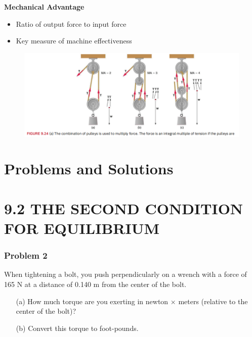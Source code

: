 \documentclass{beamer}
\begin{document}
\begin{frame}
    \item \textbf{Mechanical Advantage}
    \begin{itemize}
        \item Ratio of output force to input force
        \item Key measure of machine effectiveness
    \end{itemize}
\begin{figure}[H]
    \centering
    \includegraphics[width=1\linewidth]{Screenshot 2024-11-04 120504.png}
\end{figure}
    
\end{frame}

\section{Problems and Solutions}

\section{9.2 THE SECOND CONDITION FOR EQUILIBRIUM}

\begin{frame}
\frametitle{Problem 2}
When tightening a bolt, you push perpendicularly on a wrench with a force of 165 N at a distance of 0.140 m from the center of the bolt.
\begin{itemize}
    \item[(a)] How much torque are you exerting in newton $\times$ meters (relative to the center of the bolt)?
    \item[(b)] Convert this torque to foot-pounds.
\end{itemize}
\end{frame}
\end{document}

